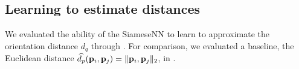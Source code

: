 
\subsection{Learning to estimate distances}\label{sec:results:distance-estimation:learned}



We evaluated the ability of the SiameseNN to learn to approximate the orientation distance $d_q$ through .
For comparison, we evaluated a baseline, the Euclidean distance $\widehat{d_p}(\mathbf{p}_i,\mathbf{p}_j) = \|\mathbf{p}_i, \mathbf{p}_j\|_2$, in .


